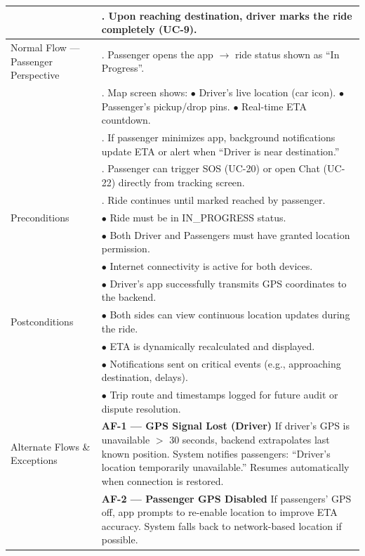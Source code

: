 \begin{longtable}{|>{\raggedright\arraybackslash}p{4cm}|>{\raggedright\arraybackslash}p{11cm}|}
& 7. Upon reaching destination, driver marks the ride completely (UC-9). \\
\hline
Normal Flow — Passenger Perspective & 1. Passenger opens the app $\rightarrow$ ride status shown as ``In Progress''. \\
& 2. Map screen shows: \newline $\bullet$ Driver's live location (car icon). \newline $\bullet$ Passenger's pickup/drop pins. \newline $\bullet$ Real-time ETA countdown. \\
& 3. If passenger minimizes app, background notifications update ETA or alert when ``Driver is near destination.'' \\
& 4. Passenger can trigger SOS (UC-20) or open Chat (UC-22) directly from tracking screen. \\
& 5. Ride continues until marked reached by passenger. \\
\hline
Preconditions & $\bullet$ Ride must be in IN\_PROGRESS status. \\
& $\bullet$ Both Driver and Passengers must have granted location permission. \\
& $\bullet$ Internet connectivity is active for both devices. \\
& $\bullet$ Driver's app successfully transmits GPS coordinates to the backend. \\
\hline
Postconditions & $\bullet$ Both sides can view continuous location updates during the ride. \\
& $\bullet$ ETA is dynamically recalculated and displayed. \\
& $\bullet$ Notifications sent on critical events (e.g., approaching destination, delays). \\
& $\bullet$ Trip route and timestamps logged for future audit or dispute resolution. \\
\hline
Alternate Flows \& Exceptions & \textbf{AF-1 — GPS Signal Lost (Driver)} \newline If driver's GPS is unavailable $>$ 30 seconds, backend extrapolates last known position. System notifies passengers: ``Driver's location temporarily unavailable.'' Resumes automatically when connection is restored. \\
& \textbf{AF-2 — Passenger GPS Disabled} \newline If passengers' GPS off, app prompts to re-enable location to improve ETA accuracy. System falls back to network-based location if possible. \\

\end{longtable}
